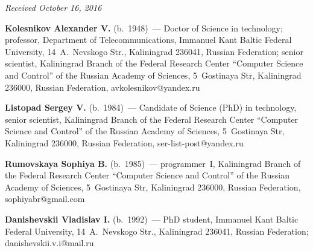 \vspace*{-3pt}

\hfill{\small\textit{Received October 16, 2016}}
  
  \Contr
  
  \noindent
  \textbf{Kolesnikov Alexander V.} (b.\ 1948)~--- Doctor of Science in 
technology; professor, Department of Telecommunications, Immanuel Kant Baltic 
Federal University, 14~A.~Nevskogo Str., Kaliningrad 236041, Russian Federation; 
senior scientist, Kaliningrad Branch of the Federal Research Center ``Computer 
Science and Control'' of the Russian Academy of Sciences, 5~Gostinaya Str, 
Kaliningrad 236000, Russian Federation, \mbox{avkolesnikov@yandex.ru} 
  
  \vspace*{4pt}
  
  \noindent
  \textbf{Listopad Sergey V.} (b.\ 1984)~--- Candidate of  Science (PhD) in 
technology, senior scientist, Kaliningrad Branch of the Federal Research Center 
``Computer Science and Control'' of the Russian Academy of Sciences, 5~Gostinaya 
Str, Kaliningrad 236000, Russian Federation, \mbox{ser-list-post@yandex.ru} 
  
  \vspace*{4pt}
  
  \noindent
  \textbf{Rumovskaya Sophiya B.} (b.\ 1985)~--- programmer~I, Kaliningrad 
Branch of the Federal Research Center ``Computer Science and Control'' of the 
Russian Academy of Sciences, 5~Gostinaya Str, Kaliningrad 236000, Russian 
Federation, \mbox{sophiyabr@gmail.com}  
  
  
  \vspace*{4pt}
  
  \noindent
  \textbf{Danishevskii Vladislav I.} (b.\ 1992)~--- PhD student, Immanuel Kant 
Baltic Federal University, 14~A.~Nevskogo Str., Kaliningrad 236041, Russian 
Federation; \mbox{danishevskii.v.i@mail.ru} 
\label{end\stat}


\renewcommand{\bibname}{\protect\rm Литература} 
    
